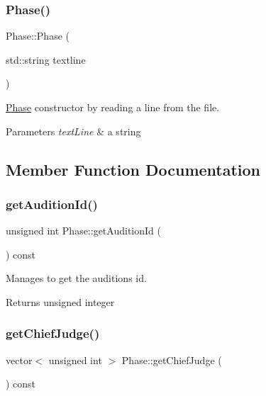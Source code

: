 \subsubsection{\texorpdfstring{Phase()}{Phase()}\hspace{0.1cm}{\footnotesize\ttfamily [2/2]}}
{\footnotesize\ttfamily Phase\+::\+Phase (\begin{DoxyParamCaption}\item[{std\+::string}]{textline }\end{DoxyParamCaption})}



\hyperlink{class_phase}{Phase} constructor by reading a line from the file. 


\begin{DoxyParams}{Parameters}
{\em text\+Line} & a string \\
\hline
\end{DoxyParams}


\subsection{Member Function Documentation}
\mbox{\label{class_phase_a7d5b0ced6ad5d523cace56f9122b0af2}} 
\subsubsection{\texorpdfstring{get\+Audition\+Id()}{getAuditionId()}}
{\footnotesize\ttfamily unsigned int Phase\+::get\+Audition\+Id (\begin{DoxyParamCaption}{ }\end{DoxyParamCaption}) const}



Manages to get the audition\textquotesingle{}s id. 

\begin{DoxyReturn}{Returns}
unsigned integer 
\end{DoxyReturn}
\mbox{\label{class_phase_a1c251350327ab06f2cc8bb8f1331d370}} 
\subsubsection{\texorpdfstring{get\+Chief\+Judge()}{getChiefJudge()}}
{\footnotesize\ttfamily vector$<$ unsigned int $>$ Phase\+::get\+Chief\+Judge (\begin{DoxyParamCaption}{ }\end{DoxyParamCaption}) const}



